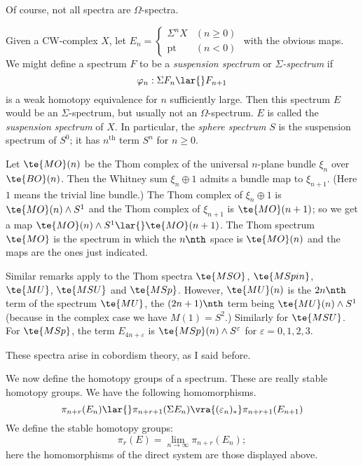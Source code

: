 \documentclass[../main]{subfiles}
\begin{document}
Of course, not all spectra are $\Omega$-spectra.

\begin{example} \label{ex:p3ch02.3}
Given a CW-complex $X$, let 
$
E_n
=
\begin{cases}
\Sigma  ^nX        &(n\geq 0) \\
\mathrm{pt} &(n<0)
\end{cases}
$
 with the obvious maps. We might define a spectrum $F$ to be a \emph{suspension spectrum} or \emph{$\Sigma$-spectrum} if
\[
\varphi_n: \Sigma   F_n \lar{} F_{n+1}
\]
is a weak homotopy equivalence for $n$ sufficiently large. Then this spectrum $E$ would be an $\Sigma$-spectrum, but usually not an $\Omega$-spectrum. $E$ is called the \emph{suspension spectrum} of $X$. In particular, the \emph{sphere spectrum} $S$ is the suspension spectrum of $S^0$; it has $n^{\text{th}}$ term $S^n$ for $n\geq 0$.
\end{example}

\begin{example} \label{ex:p3ch02.4}
Let $\te{MO}(n)$ be the Thom complex of the universal $n$-plane bundle $\xi_n$ over $\te{BO}(n)$. Then the Whitney sum $\xi_n \oplus 1$ admits a bundle map to $\xi_{n+1}$. (Here $1$ means the trivial line bundle.) The Thom complex of $\xi_n \oplus 1$ is $\te{MO}(n) \wedge S^1$ and the Thom complex of $\xi_{n+1}$ is $\te{MO}(n+1)$; so we get a map $\te{MO}(n)\wedge S^1 \lar{} \te{MO}(n+1)$. The Thom spectrum $\te{MO}$ is the spectrum in which the $n\nth$ space is $\te{MO}(n)$ and the maps are the ones just indicated. 

Similar remarks apply to the Thom spectra $\te{MSO}$, $\te{MSpin}$, $\te{MU}$, $\te{MSU}$ and $\te{MSp}$. However, $\te{MU}(n)$ is the $2n\nth$ term of the spectrum $\te{MU}$, the $(2n+1)\nth$ term being $\te{MU}(n)\wedge S^1$ (because in the complex case we have $M(1)=S^2$.) Similarly for $\te{MSU}$. For $\te{MSp}$, the term $E_{4n+\varepsilon}$ is $\te{MSp}(n)\wedge S^\varepsilon$ for $\varepsilon=0,1,2,3$. 
\end{example}

These spectra arise in cobordism theory, as I said before.

We now define the homotopy groups of a spectrum. These are really stable homotopy groups. We have the following homomorphisms.
\[
\pi_{n+r}(E_n)
\lar{}
\pi_{n+r+1}(\Sigma   E_n)
\vra{(\varepsilon_n)_\ast}
\pi_{n+r+1}(E_{n+1})
\]
We define the stable homotopy groups: 
\[
\pi_r(E) = \lim_{n\to \infty} \pi_{n+r}(E_n);
\]
here the homomorphisms of the direct system are those displayed above.
\end{document}

